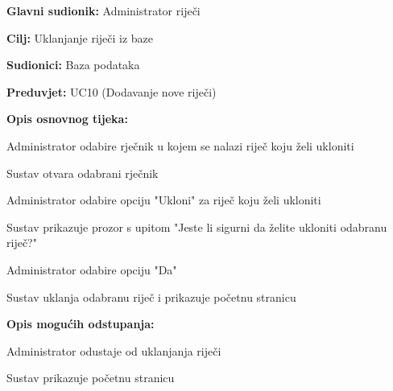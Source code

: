 					\noindent {}
				\begin{packed_item}
					
					\item \textbf{Glavni sudionik: } Administrator riječi
					\item  \textbf{Cilj:} Uklanjanje riječi iz baze
					\item  \textbf{Sudionici:} Baza podataka
					\item  \textbf{Preduvjet:} UC10 (Dodavanje nove riječi)
					\item  \textbf{Opis osnovnog tijeka:}
					
					\item[] \begin{packed_enum}
						
						\item Administrator odabire rječnik u kojem se nalazi riječ koju želi ukloniti
						\item Sustav otvara odabrani rječnik
						\item Administrator odabire opciju "Ukloni" za riječ koju želi ukloniti
						\item Sustav prikazuje prozor s upitom "Jeste li sigurni da želite ukloniti odabranu riječ?"
						\item Administrator odabire opciju "Da"
						\item Sustav uklanja odabranu riječ i prikazuje početnu stranicu
					\end{packed_enum}
					
					\item  \textbf{Opis mogućih odstupanja:}
					
					\item[] \begin{packed_item}
						
						\item[5.a] Administrator odustaje od uklanjanja riječi
						\item[] \begin{packed_enum}
						
							\item Sustav prikazuje početnu stranicu
						
						\end{packed_enum}
						
					\end{packed_item}
				\end{packed_item}
				
